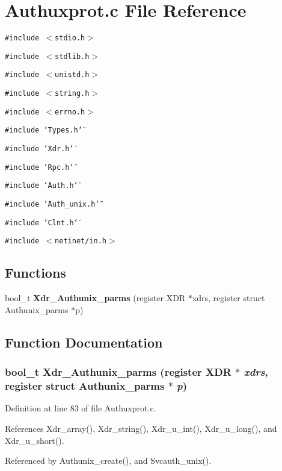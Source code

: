 \section{Authuxprot.c File Reference}
\label{Authuxprot_8c}
{\tt \#include $<$stdio.h$>$}\par
{\tt \#include $<$stdlib.h$>$}\par
{\tt \#include $<$unistd.h$>$}\par
{\tt \#include $<$string.h$>$}\par
{\tt \#include $<$errno.h$>$}\par
{\tt \#include \char`\"{}Types.h\char`\"{}}\par
{\tt \#include \char`\"{}Xdr.h\char`\"{}}\par
{\tt \#include \char`\"{}Rpc.h\char`\"{}}\par
{\tt \#include \char`\"{}Auth.h\char`\"{}}\par
{\tt \#include \char`\"{}Auth\_\-unix.h\char`\"{}}\par
{\tt \#include \char`\"{}Clnt.h\char`\"{}}\par
{\tt \#include $<$netinet/in.h$>$}\par
\subsection*{Functions}
\begin{CompactItemize}
\item 
bool\_\-t {\bf Xdr\_\-Authunix\_\-parms} (register XDR $\ast$xdrs, register struct Authunix\_\-parms $\ast$p)
\end{CompactItemize}


\subsection{Function Documentation}
\subsubsection{\setlength{\rightskip}{0pt plus 5cm}bool\_\-t Xdr\_\-Authunix\_\-parms (register XDR $\ast$ {\em xdrs}, register struct Authunix\_\-parms $\ast$ {\em p})}\label{Authuxprot_8c_a0}




Definition at line 83 of file Authuxprot.c.

References Xdr\_\-array(), Xdr\_\-string(), Xdr\_\-u\_\-int(), Xdr\_\-u\_\-long(), and Xdr\_\-u\_\-short().

Referenced by Authunix\_\-create(), and Svcauth\_\-unix().